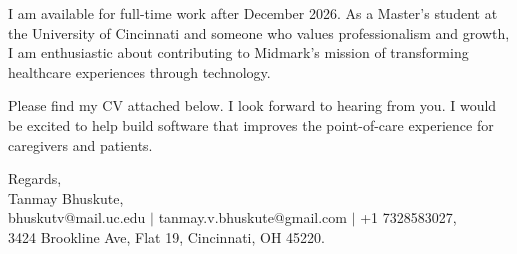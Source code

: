 \documentclass[11pt]{letter}
\begin{document}
\begin{letter}{}
I am available for full-time work after December 2026. As a Master's student at the University of Cincinnati and someone who values professionalism and growth, I am enthusiastic about contributing to Midmark's mission of transforming healthcare experiences through technology.

Please find my CV attached below. I look forward to hearing from you. I would be excited to help build software that improves the point-of-care experience for caregivers and patients.

{\setlength{\parskip}{0pt}
Regards,\\
Tanmay Bhuskute,\\
bhuskutv@mail.uc.edu $\mid$ tanmay.v.bhuskute@gmail.com $\mid$ +1 7328583027,\\
3424 Brookline Ave, Flat 19, Cincinnati, OH 45220.
}

\end{letter}
\end{document}
